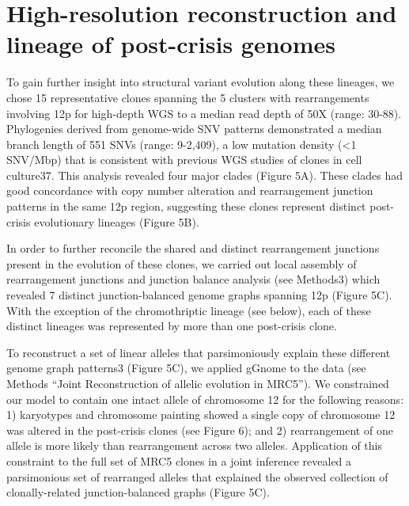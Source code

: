 \documentclass[phd,tocprelim]{cornell}
\begin{document}
\section{High-resolution reconstruction and lineage of post-crisis genomes}
To gain further insight into structural variant evolution along these lineages, we chose 15 representative clones spanning the 5 clusters with rearrangements involving 12p for high-depth WGS to a median read depth of 50X (range: 30-88). Phylogenies derived from genome-wide SNV patterns demonstrated a median branch length of 551 SNVs (range: 9-2,409), a low mutation density (<1 SNV/Mbp) that is consistent with previous WGS studies of clones in cell culture37. This analysis revealed four major clades (Figure 5A). These clades had good concordance with copy number alteration and rearrangement junction patterns in the same 12p region, suggesting these clones represent distinct post-crisis evolutionary lineages (Figure 5B). 

In order to further reconcile the shared and distinct rearrangement junctions present in the evolution of these clones, we carried out local assembly of rearrangement junctions and junction balance analysis (see Methods3) which revealed 7 distinct junction-balanced genome graphs spanning 12p (Figure 5C). With the exception of the chromothriptic lineage (see below), each of these distinct lineages was represented by more than one post-crisis clone. 

To reconstruct a set of linear alleles that parsimoniously explain these different genome graph patterns3 (Figure 5C), we applied gGnome to the data (see Methods “Joint Reconstruction of allelic evolution in MRC5”). We constrained our model to contain one intact allele of chromosome 12 for the following reasons: 1) karyotypes and chromosome painting showed a single copy of chromosome 12 was altered in the post-crisis clones (see Figure 6); and 2) rearrangement of one allele is more likely than rearrangement across two alleles. Application of this constraint to the full set of MRC5 clones in a joint inference revealed a parsimonious set of rearranged alleles that explained the observed collection of clonally-related junction-balanced graphs (Figure 5C).
\end{document}
